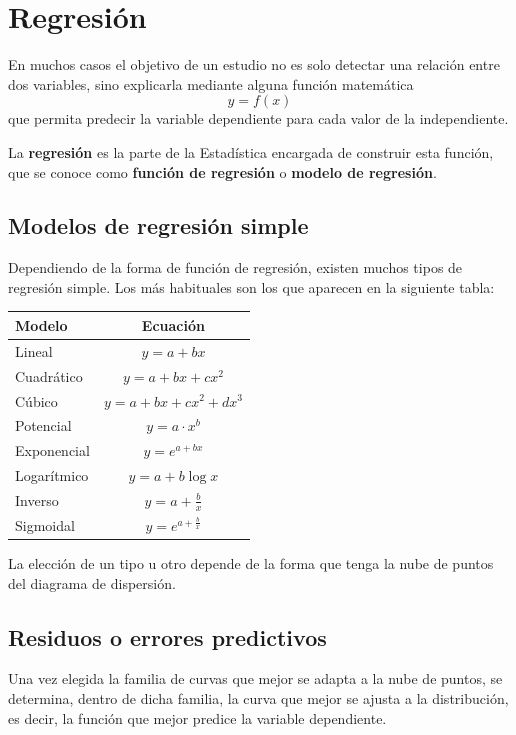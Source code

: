 \documentclass[
  spanish,
  a4paper,
]{scrreport}
\newcounter{none} %
\theoremstyle{plain}
\theoremstyle{definition}
\theoremstyle{definition}
\theoremstyle{remark}
\begin{document}
\section{Regresión}\label{regresiuxf3n-1}

En muchos casos el objetivo de un estudio no es solo detectar una
relación entre dos variables, sino explicarla mediante alguna función
matemática \[y=f(x)\] que permita predecir la variable dependiente para
cada valor de la independiente.

La \textbf{regresión} es la parte de la Estadística encargada de
construir esta función, que se conoce como \textbf{función de regresión}
o \textbf{modelo de regresión}.

\subsection{Modelos de regresión
simple}\label{modelos-de-regresiuxf3n-simple}

Dependiendo de la forma de función de regresión, existen muchos tipos de
regresión simple. Los más habituales son los que aparecen en la
siguiente tabla:

{\def\LTcaptype{none} %
\begin{longtable}[]{@{}lc@{}}
\toprule\noalign{}
\textbf{Modelo} & \textbf{Ecuación} \\
\midrule\noalign{}
\endhead
\bottomrule\noalign{}
\endlastfoot
Lineal & \(y=a+bx\) \\
Cuadrático & \(y=a+bx+cx^2\) \\
Cúbico & \(y=a+bx+cx^2+dx^3\) \\
Potencial & \(y=a\cdot x^b\) \\
Exponencial & \(y=e^{a+bx}\) \\
Logarítmico & \(y=a+b\log x\) \\
Inverso & \(y=a+\frac{b}{x}\) \\
Sigmoidal & \(y=e^{a+\frac{b}{x}}\) \\
\end{longtable}
}

La elección de un tipo u otro depende de la forma que tenga la nube de
puntos del diagrama de dispersión.

\subsection{Residuos o errores
predictivos}\label{residuos-o-errores-predictivos}

Una vez elegida la familia de curvas que mejor se adapta a la nube de
puntos, se determina, dentro de dicha familia, la curva que mejor se
ajusta a la distribución, es decir, la función que mejor predice la
variable dependiente.
\end{document}
